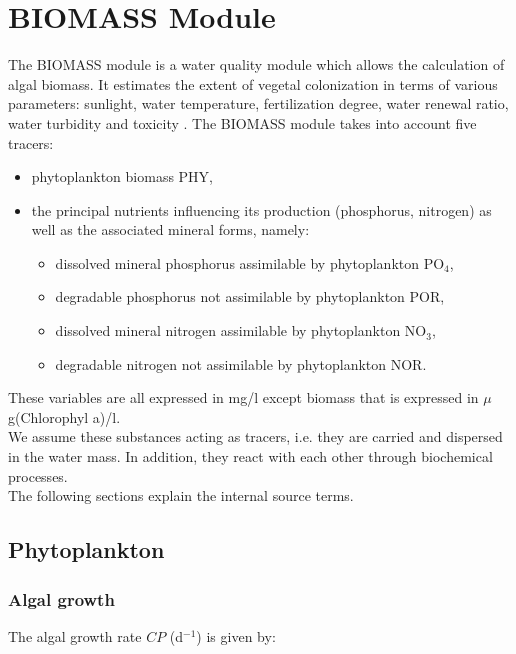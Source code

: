 \chapter{BIOMASS Module}

The BIOMASS module is a water quality module which allows the calculation of algal biomass.
It estimates the extent of vegetal colonization in terms of various parameters:
sunlight, water temperature, fertilization degree, water renewal ratio,
water turbidity and toxicity \cite{gosse_biomass_1983}.
The BIOMASS module takes into account five tracers:

\begin{itemize}
\item phytoplankton biomass PHY,
\item the principal nutrients influencing its production (phosphorus, nitrogen)
  as well as the associated mineral forms, namely:

\begin{itemize}
\item dissolved mineral phosphorus assimilable by phytoplankton PO$_4$,
\item degradable phosphorus not assimilable by phytoplankton POR,
\item dissolved mineral nitrogen assimilable by phytoplankton NO$_3$,
\item degradable nitrogen not assimilable by phytoplankton NOR.
\end{itemize}
\end{itemize}

These variables are all expressed in mg/l except biomass that is expressed in $\mu$g(Chlorophyl a)/l.\\

We assume these substances acting as tracers,
i.e. they are carried and dispersed in the water mass.
In addition, they react with each other through biochemical processes.\\

The following sections explain the internal source terms.

\section{Phytoplankton}

\subsection{Algal growth}

The algal growth rate $CP$ (d$^{-1}$) is given by:

